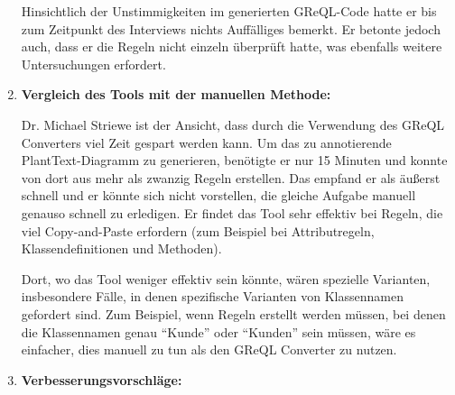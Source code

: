 \begin{enumerate}[itemsep=8pt, parsep=5pt]
    Hinsichtlich der Unstimmigkeiten im generierten GReQL-Code hatte er bis zum Zeitpunkt des Interviews nichts
    Auffälliges bemerkt. Er betonte jedoch auch, dass er die Regeln nicht einzeln überprüft hatte, was ebenfalls
    weitere Untersuchungen erfordert.


    \item \textbf{Vergleich des Tools mit der manuellen Methode:}

    Dr. Michael Striewe ist der Ansicht, dass durch die Verwendung des GReQL Converters viel Zeit gespart werden kann.
    Um das zu annotierende PlantText-Diagramm zu generieren, benötigte er nur 15 Minuten und konnte von dort aus mehr
    als zwanzig Regeln erstellen. Das empfand er als äußerst schnell und er könnte sich nicht vorstellen, die gleiche
    Aufgabe manuell genauso schnell zu erledigen. Er findet das Tool sehr effektiv bei Regeln, die viel Copy-and-Paste
    erfordern (zum Beispiel bei Attributregeln, Klassendefinitionen und Methoden).

    Dort, wo das Tool weniger effektiv sein könnte, wären spezielle Varianten, insbesondere Fälle, in denen spezifische
    Varianten von Klassennamen gefordert sind. Zum Beispiel, wenn Regeln erstellt werden müssen, bei denen die
    Klassennamen genau ``Kunde'' oder ``Kunden'' sein müssen, wäre es einfacher, dies manuell zu tun als den GReQL
    Converter zu nutzen.

    \item \textbf{Verbesserungsvorschläge:}


\end{enumerate}
